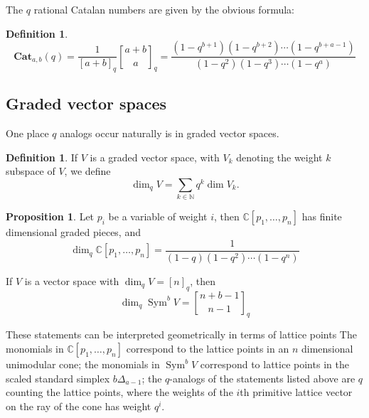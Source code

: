\documentclass{amsart}[12pt]
\theoremstyle{definition}
\newtheorem{definition}[dummy]{Definition}
\newtheorem{proposition}[dummy]{Proposition}
\newcommand{\C}{\mathbb{C}}
\newcommand{\N}{\mathbb{N}}
\newcommand{\Cat}{\mathbf{Cat}}
\DeclareMathOperator{\Sym}{Sym}
\begin{document}
The $q$ rational Catalan numbers are given by the obvious formula:
\begin{definition}
$$\Cat_{a,b}(q)=\frac{1}{[a+b]_q} {a+b \brack a}_q=
\frac{(1-q^{b+1})(1-q^{b+2})\cdots (1-q^{b+a-1})}{(1-q^2)(1-q^3)\cdots (1-q^a)}$$
\end{definition}


\subsection{Graded vector spaces}

One place $q$ analogs occur naturally is in graded vector spaces.
\begin{definition}
If $V$ is a graded vector space, with $V_k$ denoting the weight $k$ subspace of $V$, we define $$\dim_qV=\sum_{k\in \N} q^k\dim V_k.$$
\end{definition}

\begin{proposition}
Let $p_i$ be a variable of weight $i$, then $\C[p_1,\dots, p_n]$ has
finite dimensional graded pieces, and
$$\dim_q \C[p_1,\dots, p_n]=\frac{1}{(1-q)(1-q^2)\cdots(1-q^n)}$$

If $V$ is a vector space with $\dim_qV=[n]_q$, then
$$\dim_q \Sym^b V={n+b-1 \brack n-1}_q$$
\end{proposition}

These statements can be interpreted geometrically in terms of lattice
points   The monomials in $\C[p_1,\dots, p_n]$ correspond to the lattice points in an $n$ dimensional unimodular cone; the monomials in $\Sym^b V$ correspond to lattice points in the scaled standard simplex $b\Delta_{a-1}$; the $q$-analogs of the statements listed above are $q$ counting the lattice points, where the weights of the $i$th primitive lattice vector on the ray of the cone has weight $q^i$.
\end{document}

